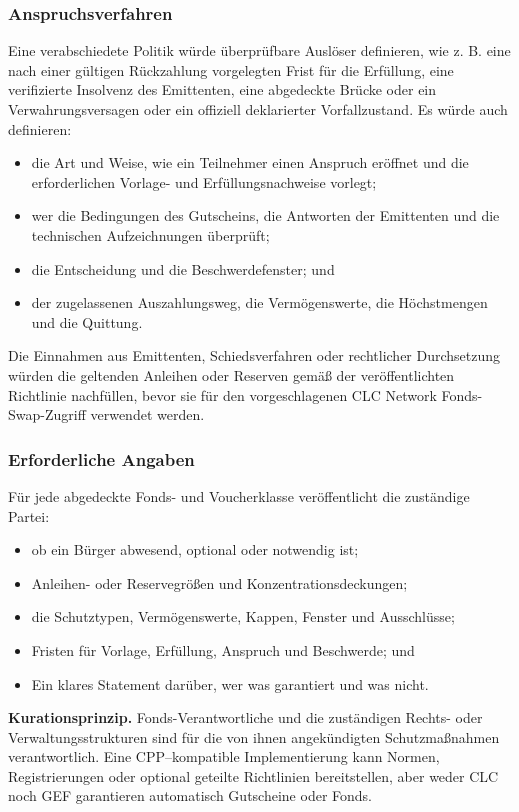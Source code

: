 \documentclass[11pt]{article}
\begin{document}
\subsubsection*{Anspruchsverfahren}

Eine verabschiedete Politik würde überprüfbare Auslöser definieren, wie z. B. eine nach einer gültigen Rückzahlung vorgelegten Frist für die Erfüllung, eine verifizierte Insolvenz des Emittenten, eine abgedeckte Brücke oder ein Verwahrungsversagen oder ein offiziell deklarierter Vorfallzustand. Es würde auch definieren:

\begin{itemize}[leftmargin=*]
\item die Art und Weise, wie ein Teilnehmer einen Anspruch eröffnet und die erforderlichen Vorlage- und Erfüllungsnachweise vorlegt;
\item wer die Bedingungen des Gutscheins, die Antworten der Emittenten und die technischen Aufzeichnungen überprüft;
\item die Entscheidung und die Beschwerdefenster; und
\item der zugelassenen Auszahlungsweg, die Vermögenswerte, die Höchstmengen und die Quittung.
\end{itemize}
Die Einnahmen aus Emittenten, Schiedsverfahren oder rechtlicher Durchsetzung würden die geltenden Anleihen oder Reserven gemäß der veröffentlichten Richtlinie nachfüllen, bevor sie für den vorgeschlagenen CLC Network Fonds-Swap-Zugriff verwendet werden.

\subsubsection*{Erforderliche Angaben}

Für jede abgedeckte Fonds- und Voucherklasse veröffentlicht die zuständige Partei:

\begin{itemize}[leftmargin=*]
\item ob ein Bürger abwesend, optional oder notwendig ist;
\item Anleihen- oder Reservegrößen und Konzentrationsdeckungen;
\item die Schutztypen, Vermögenswerte, Kappen, Fenster und Ausschlüsse;
\item Fristen für Vorlage, Erfüllung, Anspruch und Beschwerde; und
\item Ein klares Statement darüber, wer was garantiert und was nicht.
\end{itemize}
\textbf{Kurationsprinzip.} Fonds-Verantwortliche und die zuständigen Rechts- oder Verwaltungsstrukturen sind für die von ihnen angekündigten Schutzmaßnahmen verantwortlich. Eine CPP--kompatible Implementierung kann Normen, Registrierungen oder optional geteilte Richtlinien bereitstellen, aber weder CLC noch GEF garantieren automatisch Gutscheine oder Fonds.
\end{document}
